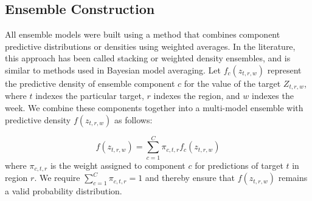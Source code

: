 \documentclass{article}\usepackage[]{graphicx}\usepackage[]{color}
\begin{document}
\subsection*{Ensemble Construction} \label{sec:stacking}

All ensemble models were built using a method that combines component predictive distributions or densities using weighted averages. In the literature, this approach has been called stacking\cite{Wolpert1992} or weighted density ensembles\cite{Ray2018}, and is similar to methods used in Bayesian model averaging\cite{Raftery2005}. Let $f_c(z_{t,r,w})$ represent the predictive density of ensemble component $c$ for the value of the target $Z_{t,r,w}$, where $t$ indexes the particular target, $r$ indexes the region, and $w$ indexes the week. We combine these components together into a multi-model ensemble with predictive density $f(z_{t,r,w})$ as follows:

\begin{equation}
f(z_{t,r,w})  = \sum^C_{c = 1} \pi_{c,t,r} f_c(z_{t,r,w})
\label{eq:enseq}
\end{equation}
where $\pi_{c, t, r}$ is the weight assigned to component $c$ for predictions of target $t$ in region $r$. We require $\sum^C_{c = 1} \pi_{c,t,r} = 1$ and thereby ensure that $f(z_{t,r,w})$ remains a valid probability distribution. 
\end{document}
